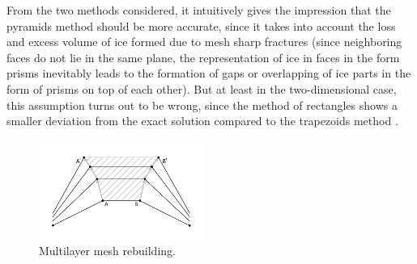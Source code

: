 \documentclass[
11pt,%
tightenlines,%
twoside,%
onecolumn,%
nofloats,%
nobibnotes,%
nofootinbib,%
superscriptaddress,%
noshowpacs,%
centertags]%
{revtex4}
\begin{document}
From the two methods considered, it intuitively gives the impression that the pyramids method should be more accurate, since it takes into account the loss and excess volume of ice formed due to mesh sharp fractures (since neighboring faces do not lie in the same plane, the representation of ice in faces in the form prisms inevitably leads to the formation of gaps or overlapping of ice parts in the form of prisms on top of each other).
But at least in the two-dimensional case, this assumption turns out to be wrong, since the method of rectangles shows a smaller deviation from the exact solution compared to the trapezoids method \cite{Rybakov_2D}.

\begin{figure}[h]
\includegraphics[width=0.48\textwidth]{pics/pic_classical_methods_multilayer_size.pdf}
\caption{Multilayer mesh rebuilding.}\label{fig:pic_classical_methods_multilayer}
\end{figure}
\end{document}
